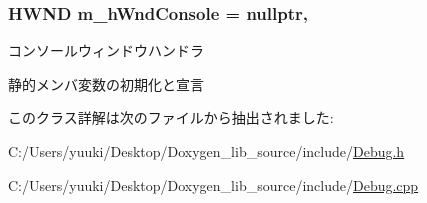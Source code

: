 \subsubsection[{\texorpdfstring{m\+\_\+h\+Wnd\+Console}{m_hWndConsole}}]{\setlength{\rightskip}{0pt plus 5cm}H\+W\+ND m\+\_\+h\+Wnd\+Console = nullptr\hspace{0.3cm}{\ttfamily [static]}, {\ttfamily [private]}}\hypertarget{class_debug_aac93c9dce14754b224b4f30c58301a41}{}\label{class_debug_aac93c9dce14754b224b4f30c58301a41}
コンソールウィンドウハンドラ

静的メンバ変数の初期化と宣言 

このクラス詳解は次のファイルから抽出されました\+:\begin{DoxyCompactItemize}
\item 
C\+:/\+Users/yuuki/\+Desktop/\+Doxygen\+\_\+lib\+\_\+source/include/\hyperlink{_debug_8h}{Debug.\+h}\item 
C\+:/\+Users/yuuki/\+Desktop/\+Doxygen\+\_\+lib\+\_\+source/include/\hyperlink{_debug_8cpp}{Debug.\+cpp}\end{DoxyCompactItemize}
